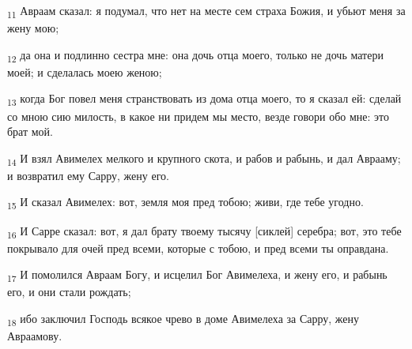 \begin{tcolorbox}
\textsubscript{11} Авраам сказал: я подумал, что нет на месте сем страха Божия, и убьют меня за жену мою;
\end{tcolorbox}
\begin{tcolorbox}
\textsubscript{12} да она и подлинно сестра мне: она дочь отца моего, только не дочь матери моей; и сделалась моею женою;
\end{tcolorbox}
\begin{tcolorbox}
\textsubscript{13} когда Бог повел меня странствовать из дома отца моего, то я сказал ей: сделай со мною сию милость, в какое ни придем мы место, везде говори обо мне: это брат мой.
\end{tcolorbox}
\begin{tcolorbox}
\textsubscript{14} И взял Авимелех мелкого и крупного скота, и рабов и рабынь, и дал Аврааму; и возвратил ему Сарру, жену его.
\end{tcolorbox}
\begin{tcolorbox}
\textsubscript{15} И сказал Авимелех: вот, земля моя пред тобою; живи, где тебе угодно.
\end{tcolorbox}
\begin{tcolorbox}
\textsubscript{16} И Сарре сказал: вот, я дал брату твоему тысячу [сиклей] серебра; вот, это тебе покрывало для очей пред всеми, которые с тобою, и пред всеми ты оправдана.
\end{tcolorbox}
\begin{tcolorbox}
\textsubscript{17} И помолился Авраам Богу, и исцелил Бог Авимелеха, и жену его, и рабынь его, и они стали рождать;
\end{tcolorbox}
\begin{tcolorbox}
\textsubscript{18} ибо заключил Господь всякое чрево в доме Авимелеха за Сарру, жену Авраамову.
\end{tcolorbox}
